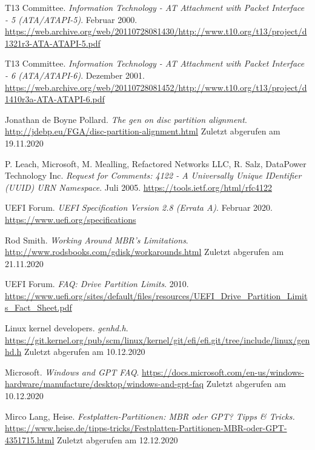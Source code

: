 \begin{thebibliography}{99}
        T13 Committee.
        \textit{Information Technology - AT Attachment with Packet Interface - 5 (ATA/ATAPI-5)}.
        Februar 2000.
        \url{https://web.archive.org/web/20110728081430/http://www.t10.org/t13/project/d1321r3-ATA-ATAPI-5.pdf}

        T13 Committee.
        \textit{Information Technology - AT Attachment with Packet Interface - 6 (ATA/ATAPI-6)}.
        Dezember 2001.
        \url{https://web.archive.org/web/20110728081452/http://www.t10.org/t13/project/d1410r3a-ATA-ATAPI-6.pdf}

        Jonathan de Boyne Pollard.
        \textit{The gen on disc partition alignment}.
        \url{http://jdebp.eu/FGA/disc-partition-alignment.html}
        Zuletzt abgerufen am 19.11.2020

        P. Leach, Microsoft, M. Mealling, Refactored Networks LLC, R. Salz, DataPower Technology Inc.
        \textit{Request for Comments: 4122 - A Universally Unique IDentifier (UUID) URN Namespace}.
        Juli 2005.
        \url{https://tools.ietf.org/html/rfc4122}

        UEFI Forum.
        \textit{UEFI Specification Version 2.8 (Errata A)}.
        Februar 2020.
        \url{https://www.uefi.org/specifications}

        Rod Smith.
        \textit{Working Around MBR's Limitations}.
        \url{http://www.rodsbooks.com/gdisk/workarounds.html}
        Zuletzt abgerufen am 21.11.2020

        UEFI Forum.
        \textit{FAQ: Drive Partition Limits}.
        2010.
        \url{https://www.uefi.org/sites/default/files/resources/UEFI_Drive_Partition_Limits_Fact_Sheet.pdf}


        Linux kernel developers.
        \textit{genhd.h}.
        \url{https://git.kernel.org/pub/scm/linux/kernel/git/efi/efi.git/tree/include/linux/genhd.h}
        Zuletzt abgerufen am 10.12.2020

        Microsoft.
        \textit{Windows and GPT FAQ}.
        \url{https://docs.microsoft.com/en-us/windows-hardware/manufacture/desktop/windows-and-gpt-faq}
        Zuletzt abgerufen am 10.12.2020

        Mirco Lang, Heise.
        \textit{Festplatten-Partitionen: MBR oder GPT? Tipps \& Tricks.}
        \url{https://www.heise.de/tipps-tricks/Festplatten-Partitionen-MBR-oder-GPT-4351715.html}
        Zuletzt abgerufen am 12.12.2020
\end{thebibliography}
